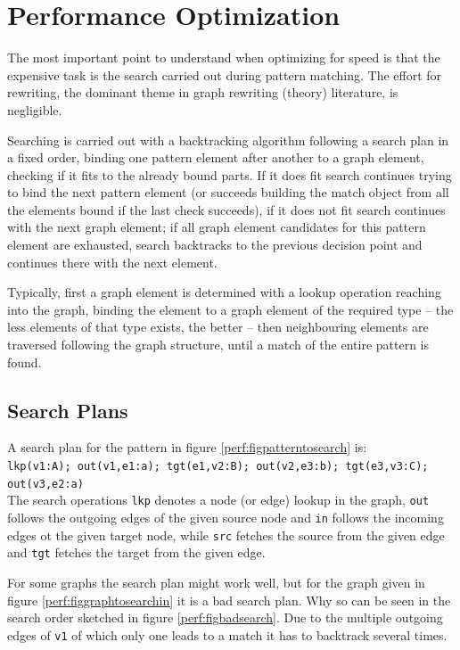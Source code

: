 \chapter{Performance Optimization}\label{sec:performance} 

The most important point to understand when optimizing for speed is that the expensive task is the search carried out during pattern matching. The effort for rewriting, the dominant theme in graph rewriting (theory) literature, is negligible.

Searching is carried out with a backtracking algorithm following a search plan in a fixed order, 
binding one pattern element after another to a graph element, checking if it fits to the already bound parts.
If it does fit search continues trying to bind the next pattern element (or succeeds building the match object from all the elements bound if the last check succeeds), if it does not fit search continues with the next graph element; if all graph element candidates for this pattern element are exhausted, search backtracks to the previous decision point and continues there with the next element.

Typically, first a graph element is determined with a lookup operation reaching into the graph, binding the element to a graph element of the required type -- the less elements of that type exists, the better -- then neighbouring elements are traversed following the graph structure, until a match of the entire pattern is found.


\section{Search Plans}

A search plan for the pattern in figure \ref{perf:figpatterntosearch} is:\\
\texttt{lkp(v1:A); out(v1,e1:a); tgt(e1,v2:B); out(v2,e3:b); tgt(e3,v3:C); out(v3,e2:a)}\\
The search operations \texttt{lkp} denotes a node (or edge) lookup in the graph, \texttt{out} follows the outgoing edges of the given source node and \texttt{in} follows the incoming edges ot the given target node, while \texttt{src} fetches the source from the given edge and \texttt{tgt} fetches the target from the given edge.

For some graphs the search plan might work well, but for the graph given in figure \ref{perf:figgraphtosearchin} it is a bad search plan.
Why so can be seen in the search order sketched in figure \ref{perf:figbadsearch}.
Due to the multiple outgoing edges of \texttt{v1} of which only one leads to a match it has to backtrack several times.

